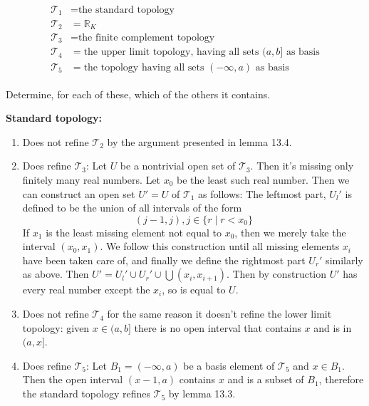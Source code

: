 \documentclass[paper=a4, fontsize=11pt]{scrartcl} %
\newcommand{\script}{\mathcal}
\numberwithin{equation}{section}    %
\numberwithin{figure}{section}      %
\numberwithin{table}{section}       %
\begin{document}
\begin{align*} 
	\begin{split}
    \script T_1 &= \text{the standard topology}\\
    \script T_2 &= \mathbb R_K\\
    \script T_3 &= \text{the finite complement topology}\\
    \script T_4 &= \text{the upper limit topology, having all sets $(a, b]$ as basis}\\
    \script T_5 &= \text{the topology having all sets $(-\infty, a)$ as basis}
	\end{split}					
\end{align*}

Determine, for each of these, which of the others it contains.

\textbf {Standard topology:}
\begin{enumerate}
  \item Does not refine $\script T_2$ by the argument presented in lemma 13.4.
  \item Does refine $\script T_3$: Let $U$ be a nontrivial open set of
    $\script T_3$. Then it's missing only finitely many real numbers. Let $x_0$
    be the least such real number. Then we can construct an open set $U' = U$ of
    $\script T_1$ as follows: The leftmost part, $U_l'$ is defined to be the
    union of all intervals of the form
    \[ (j-1, j), j \in \{ r \mid r < x_0 \} \]
    If $x_1$ is the least missing element not equal to $x_0$, then we merely
    take the interval $(x_0, x_1)$. We follow this construction until all missing
    elements $x_i$ have been taken care of, and finally we define the rightmost
    part $U_r'$ similarly as above. Then $U' = U_l' \cup U_r' \cup \bigcup(x_i, x_{i+1})$.
    Then by construction $U'$ has every real number except the $x_i$, so is equal
    to $U$.
  \item Does not refine $\script T_4$ for the same reason it doesn't refine the
    lower limit topology: given $x \in (a, b]$ there is no open interval that
    contains $x$ and is in $(a, x]$.
  \item Does refine $\script T_5$: Let $B_1 = (-\infty, a) $ be a basis element
    of $\script T_5$ and $x \in B_1$. Then the open interval $(x-1, a)$ contains
    $x$ and is a subset of $B_1$, therefore the standard topology refines
    $\script T_5$ by lemma 13.3.
\end{enumerate}
\end{document}
